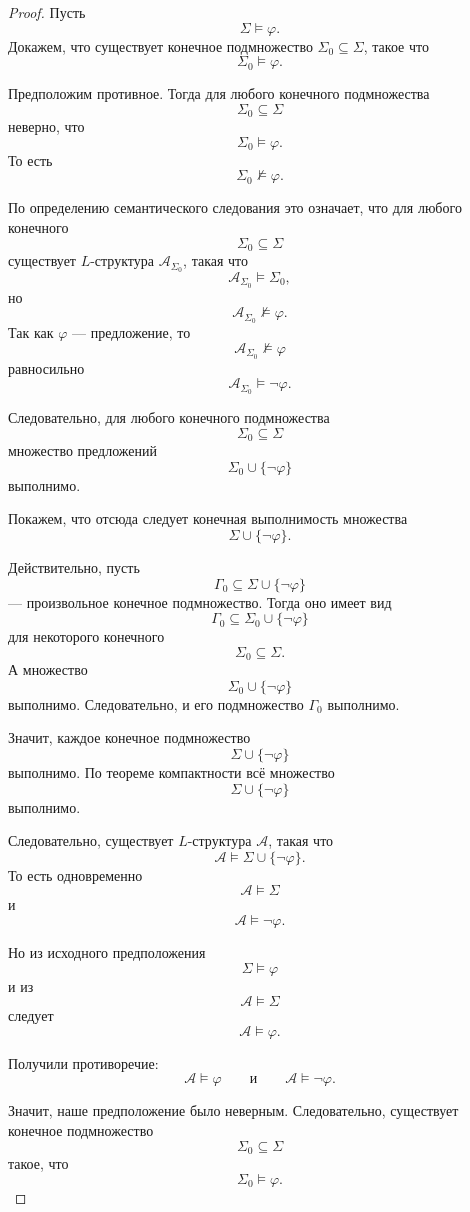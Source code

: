 \documentclass[12pt,a4paper,oneside,openany]{book}
\theoremstyle{definition}
\theoremstyle{plain}
\theoremstyle{remark}
\begin{document}
\begin{proof}
Пусть
\[
\Sigma\models\varphi.
\]
Докажем, что существует конечное подмножество $\Sigma_0\subseteq\Sigma$, такое что
\[
\Sigma_0\models\varphi.
\]

Предположим противное. Тогда для любого конечного подмножества
\[
\Sigma_0\subseteq\Sigma
\]
неверно, что
\[
\Sigma_0\models\varphi.
\]
То есть
\[
\Sigma_0\not\models\varphi.
\]

По определению семантического следования это означает, что для любого конечного
\[
\Sigma_0\subseteq\Sigma
\]
существует $L$-структура $\mathcal A_{\Sigma_0}$, такая что
\[
\mathcal A_{\Sigma_0}\models\Sigma_0,
\]
но
\[
\mathcal A_{\Sigma_0}\not\models\varphi.
\]
Так как $\varphi$ — предложение, то
\[
\mathcal A_{\Sigma_0}\not\models\varphi
\]
равносильно
\[
\mathcal A_{\Sigma_0}\models\neg\varphi.
\]

Следовательно, для любого конечного подмножества
\[
\Sigma_0\subseteq\Sigma
\]
множество предложений
\[
\Sigma_0\cup\{\neg\varphi\}
\]
выполнимо.

Покажем, что отсюда следует конечная выполнимость множества
\[
\Sigma\cup\{\neg\varphi\}.
\]

Действительно, пусть
\[
\Gamma_0\subseteq \Sigma\cup\{\neg\varphi\}
\]
— произвольное конечное подмножество. Тогда оно имеет вид
\[
\Gamma_0\subseteq \Sigma_0\cup\{\neg\varphi\}
\]
для некоторого конечного
\[
\Sigma_0\subseteq\Sigma.
\]
А множество
\[
\Sigma_0\cup\{\neg\varphi\}
\]
выполнимо. Следовательно, и его подмножество $\Gamma_0$ выполнимо.

Значит, каждое конечное подмножество
\[
\Sigma\cup\{\neg\varphi\}
\]
выполнимо. По теореме компактности всё множество
\[
\Sigma\cup\{\neg\varphi\}
\]
выполнимо.

Следовательно, существует $L$-структура $\mathcal A$, такая что
\[
\mathcal A\models\Sigma\cup\{\neg\varphi\}.
\]
То есть одновременно
\[
\mathcal A\models\Sigma
\]
и
\[
\mathcal A\models\neg\varphi.
\]

Но из исходного предположения
\[
\Sigma\models\varphi
\]
и из
\[
\mathcal A\models\Sigma
\]
следует
\[
\mathcal A\models\varphi.
\]

Получили противоречие:
\[
\mathcal A\models\varphi
\qquad
\text{и}
\qquad
\mathcal A\models\neg\varphi.
\]

Значит, наше предположение было неверным. Следовательно, существует конечное подмножество
\[
\Sigma_0\subseteq\Sigma
\]
такое, что
\[
\Sigma_0\models\varphi.
\]
\end{proof}
\end{document}
